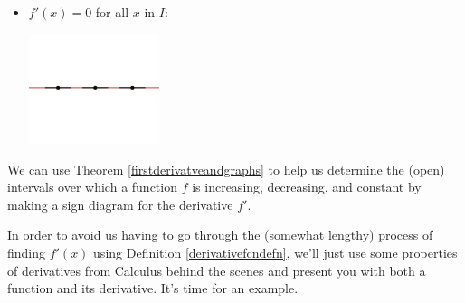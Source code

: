 \documentclass{ximera}
\begin{document}
\begin{itemize}
\begin{center}
\begin{multicols}{2}
\end{multicols}

\end{center}


\item $f'(x) = 0$  for all $x$ in $I$:

\begin{center}

\includegraphics[width=1.5in]{./AppDerivativesGraphics/Constant.png} 

\end{center}

\end{itemize}

We can use Theorem \ref{firstderivatveandgraphs} to help us determine the (open) intervals over which a function $f$ is increasing, decreasing, and constant by making a sign diagram for the derivative $f'$. 

\medskip

In order to avoid us having to go through the (somewhat lengthy) process of finding $f'(x)$ using Definition \ref{derivativefcndefn}, we'll just use some properties of derivatives from Calculus behind the scenes and present you with both a function and its derivative.  It's time for an example.

\medskip
\end{document}
